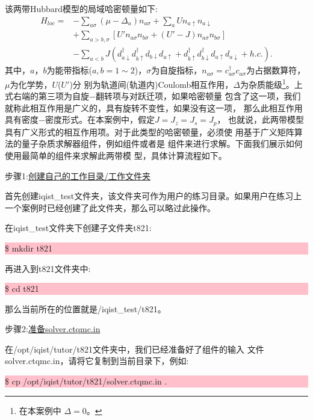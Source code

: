 该两带Hubbard模型的局域哈密顿量如下:
\begin{equation}
\label{eq:loc}
\begin{split}
H_{loc} = &- \sum_{a\sigma}(\mu - \Delta_a) n_{a\sigma} + \sum_{a} Un_{a\uparrow}n_{a\downarrow} \\
          &+ \sum_{a > b,\sigma}[U'n_{a\sigma}n_{b\bar{\sigma}} + (U'-J)n_{a\sigma}n_{b\sigma}] \\
          &- \sum_{a < b} J (d^{\dagger}_{a\downarrow}d^{\dagger}_{b\uparrow}d_{b\downarrow}d_{a\uparrow} 
           + d^{\dagger}_{b\uparrow}d^{\dagger}_{b\downarrow}d_{a\uparrow}d_{a\downarrow} + h.c.).
\end{split}
\end{equation}
其中，$a$，$b$为能带指标($a, b = 1 \sim 2$)，$\sigma$为自旋指标，$n_{a\sigma} = 
c^{\dagger}_{a\sigma}c_{a\sigma}$为占据数算符，$\mu$为化学势，$U$($U'$)分
别为轨道间(轨道内)Coulomb相互作用，$\Delta$为杂质能级\footnote{在本案例中
$\Delta = 0$。}。上式右端的第三项为自旋$-$翻转项与对跃迁项，如果哈密顿量
包含了这一项，我们就称此相互作用是广义的，具有旋转不变性，如果没有这一项，
那么此相互作用具有密度$-$密度形式。在本案例中，假定$J = J_{z} = J_{s} = J_{p}$，
也就说，此两带模型具有广义形式的相互作用项。对于此类型的哈密顿量，必须使
用基于广义矩阵算法的量子杂质求解器组件，例如{\begonia}组件或者是{\lavender}
组件来进行求解。下面我们展示如何使用最简单的{\begonia}组件来求解此两带模
型，具体计算流程如下。

步骤1:\underline{创建自己的工作目录/工作文件夹}

首先创建iqist\_test文件夹，该文件夹可作为用户的练习目录。如果用户在练习上
一个案例时已经创建了此文件夹，那么可以略过此操作。

在iqist\_test文件夹下创建子文件夹t821:

\noindent\colorbox{pink}{\parbox[r]{\linewidth}{\quad \$ mkdir t821 }}

再进入到t821文件夹中:

\noindent\colorbox{pink}{\parbox[r]{\linewidth}{\quad \$ cd t821 }}

那么当前所在的位置就是/iqist\_test/t821。

步骤2:\underline{准备solver.ctqmc.in}

在/opt/iqist/tutor/t821文件夹中，我们已经准备好了{\begonia}组件的输入
文件solver.ctqmc.in，请将它复制到当前目录下，例如:

\noindent\colorbox{pink}{\parbox[r]{\linewidth}{\quad \$ cp /opt/iqist/tutor/t821/solver.ctqmc.in . }}

